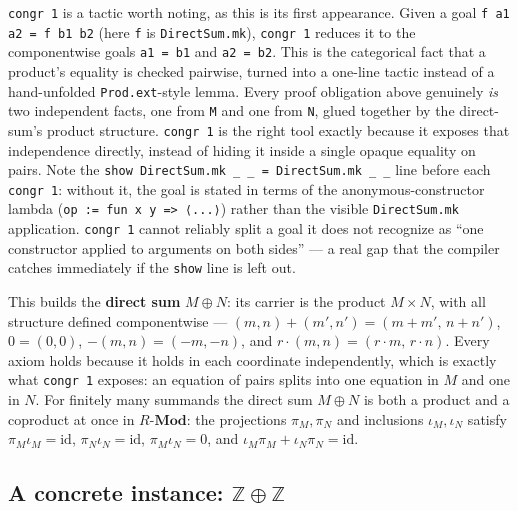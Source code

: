 \texttt{congr 1} is a tactic worth noting, as this is its first appearance. Given a goal \texttt{f a1 a2 = f b1 b2} (here \texttt{f} is \texttt{DirectSum.mk}), \texttt{congr 1} reduces it to the componentwise goals \texttt{a1 = b1} and \texttt{a2 = b2}. This is the categorical fact that a product's equality is checked pairwise, turned into a one-line tactic instead of a hand-unfolded \texttt{Prod.ext}-style lemma. Every proof obligation above genuinely \emph{is} two independent facts, one from \texttt{M} and one from \texttt{N}, glued together by the direct-sum's product structure. \texttt{congr 1} is the right tool exactly because it exposes that independence directly, instead of hiding it inside a single opaque equality on pairs. Note the \texttt{show DirectSum.mk \_\allowbreak{} \_\allowbreak{} = DirectSum.mk \_\allowbreak{} \_\allowbreak{}} line before each \texttt{congr 1}: without it, the goal is stated in terms of the anonymous-constructor lambda (\texttt{op := fun x y => ⟨...⟩}) rather than the visible \texttt{DirectSum.mk} application. \texttt{congr 1} cannot reliably split a goal it does not recognize as ``one constructor applied to arguments on both sides'' --- a real gap that the compiler catches immediately if the \texttt{show} line is left out.

\begin{mathreading}

This builds the \textbf{direct sum} \(M \oplus N\): its carrier is the product \(M \times N\), with all structure defined componentwise --- \((m,n) + (m',n') = (m+m',\, n+n')\), \(0 = (0,0)\), \(-(m,n) =
(-m,-n)\), and \(r\cdot(m,n) = (r\cdot m,\, r\cdot n)\). Every axiom holds because it holds in each coordinate independently, which is exactly what \texttt{congr 1} exposes: an equation of pairs splits into one equation in \(M\) and one in \(N\). For finitely many summands the direct sum \(M \oplus N\) is both a product and a coproduct at once in \(R\text{-}\mathbf{Mod}\): the projections \(\pi_M, \pi_N\) and inclusions \(\iota_M, \iota_N\) satisfy \(\pi_M\iota_M = \mathrm{id}\), \(\pi_N\iota_N = \mathrm{id}\), \(\pi_M\iota_N =
0\), and \(\iota_M\pi_M + \iota_N\pi_N = \mathrm{id}\).

\end{mathreading}

\begin{center}

\end{center}

\subsection{\texorpdfstring{A concrete instance: \(\mathbb{Z} \oplus \mathbb{Z}\)}{A concrete instance: \textbackslash mathbb\{Z\} \textbackslash oplus \textbackslash mathbb\{Z\}}}\label{sec:10-modules:06-direct-sums:3}

